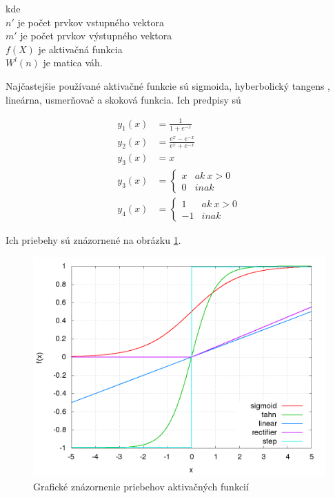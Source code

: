 kde \\
$n'$ je počet prvkov vstupného vektora \\
$m'$ je počet prvkov výstupného vektora \\
$f(X)$ je aktivačná funkcia \\
$W^l(n)$ je matica váh.

Najčastejšie používané aktivačné funkcie sú sigmoida, hyberbolický tangens , lineárna,
usmerňovač a skoková funkcia. Ich predpisy sú

\begin{align}
y_1(x) &= \frac{1}{1+e^{-x}} \\
y_2(x) &= \frac{e^{x} - e^{-x}}{e^{x} + e^{-x}} \\
y_3(x) &= x \\
y_3(x) &= \left\{
	\begin{array}{ll}
		x  & ak \ x > 0 \\
		0 & inak
	\end{array}
\right. \\
y_4(x) &= \left\{
	\begin{array}{ll}
		1  & ak \ x > 0 \\
		-1 & inak
	\end{array}
\right.
\label{eq:nn_transfer_function}
\end{align}

Ich priebehy sú znázornené na obrázku \ref{img:nn_functions}.

\begin{figure}[!htb]
\center
\includegraphics[scale=.4]{../pictures/nn_functions.png}
\caption{Grafické znázornenie priebehov aktivačných funkcií}
\label{img:nn_functions}
\end{figure}

